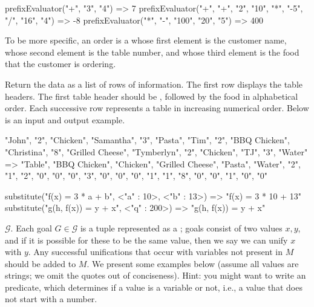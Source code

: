 \begin{verbnobox}[\small]
prefixEvaluator({"+", "3", "4"}) => 7
prefixEvaluator({"+", "+", "2", "10", "*", "-5", "/", "16", "4"}) => -8
prefixEvaluator({"*", "-", "100", "20", "5"}) => 400
\end{verbnobox}


To be more specific, an order is a  whose first element is the customer name, whose second element is the table number, and whose third element is the food that the customer is ordering. 

Return the data as a list of rows of information. The first row displays the table headers. The first table header should be , followed by the food in alphabetical order. Each successive row represents a table in increasing numerical order. Below is an input and output example.

\begin{verbnobox}[\small]
{{"John", "2", "Chicken"}, {"Samantha", "3", "Pasta"}, 
 {"Tim", "2", "BBQ Chicken"}, {"Christina", "8", "Grilled Cheese"}, 
 {"Tymberlyn", "2", "Chicken"}, {"TJ", "3", "Water"}}
=> 
{{"Table", "BBQ Chicken", "Chicken", "Grilled Cheese", "Pasta", "Water"},
 {"2", "1", "2", "0", "0", "0"},
 {"3", "0", "0", "0", "1", "1"},
 {"8", "0", "0", "1", "0", "0"}}
\end{verbnobox}


\begin{verbnobox}[\small]
substitute("f(x) = 3 * a + b", {<"a" : 10>, <"b" : 13>})
           => "f(x) = 3 * 10 + 13"
substitute("g(h, f(x)) = y + x", {<"q" : 200>})          
           => "g(h, f(x)) = y + x" 
\end{verbnobox}

 $\mathcal{G}$. Each goal $G \in \mathcal{G}$ is a tuple represented as a ; goals consist of two values $x, y$, and if it is possible for these to be the same value, then we say we can unify $x$ with $y$. Any successful unifications that occur with variables not present in $M$ should be added to $M$. We present some examples below (assume all values are strings; we omit the quotes out of conciseness). Hint: you might want to write an  predicate, which determines if a value is a variable or not, i.e., a value that does not start with a number.

